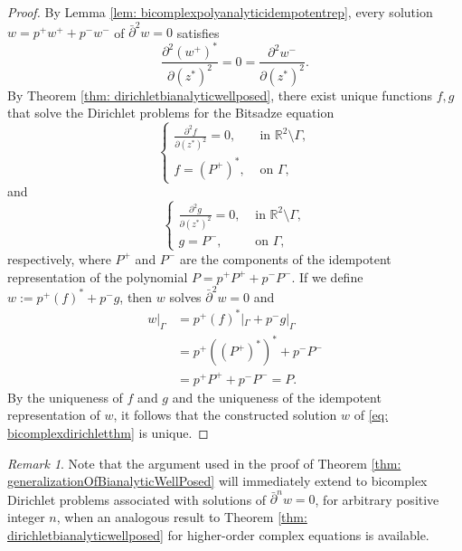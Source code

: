 \documentclass[12pt,reqno]{amsart}
\theoremstyle{definition}
\theoremstyle{remark}
\newtheorem{comm}[theorem]{Remark}
\newcommand{\p}{\partial}
\newcommand{\dbar}{\bar\partial}
\begin{document}
                \begin{proof}

                By Lemma \ref{lem: bicomplexpolyanalyticidempotentrep}, every solution $w = p^+ w^+ + p^- w^-$ of $\dbar^2 w = 0$ satisfies 
                \[
                    \frac{\p^2 (w^+)^*}{\p (z^*)^2} = 0 = \frac{\p^2 w^-}{\p (z^*)^2}.
                \]
                By Theorem \ref{thm: dirichletbianalyticwellposed}, there exist unique functions $f, g$ that solve the Dirichlet problems for the Bitsadze equation
                \[
                    \begin{cases}
                        \frac{\p^2 f}{\p(z^*)^2}  = 0, & \text{ in } \mathbb{R}^2\setminus \Gamma,\\
                        f = (P^+)^*, & \text{ on } \Gamma,
                    \end{cases}
                \]
                and 
               \[
                    \begin{cases}
                        \frac{\p^2 g}{\p(z^*)^2}  = 0, & \text{ in } \mathbb{R}^2\setminus \Gamma,\\
                        g = P^-, & \text{ on } \Gamma,
                    \end{cases}
                \]
                respectively, where $P^+$ and $P^-$ are the components of the idempotent representation of the polynomial $P = p^+ P^+ + p^- P^-$. If we define $w:= p^+(f)^* + p^- g$, then $w$ solves $\dbar^2 w = 0$ and 
                \begin{align*}
                    w|_{\Gamma} &= p^+ (f)^*|_{\Gamma} + p^- g|_{\Gamma} \\
                    &= p^+ ((P^+)^*)^* + p^- P^-\\
                    &= p^+ P^+ + p^- P^- = P.
                \end{align*}
                By the uniqueness of $f$ and $g$ and the uniqueness of the idempotent representation of $w$, it follows that the constructed solution $w$ of \eqref{eq: bicomplexdirichletthm} is unique. 
                
                

                
            \end{proof}

            \begin{comm}
                Note that the argument used in the proof of Theorem \ref{thm: generalizationOfBianalyticWellPosed} will immediately extend to bicomplex Dirichlet problems associated with solutions of $\dbar^n w =0$, for arbitrary positive integer $n$, when an analogous result to Theorem \ref{thm: dirichletbianalyticwellposed} for higher-order complex equations is available. 
            \end{comm}
\end{document}
